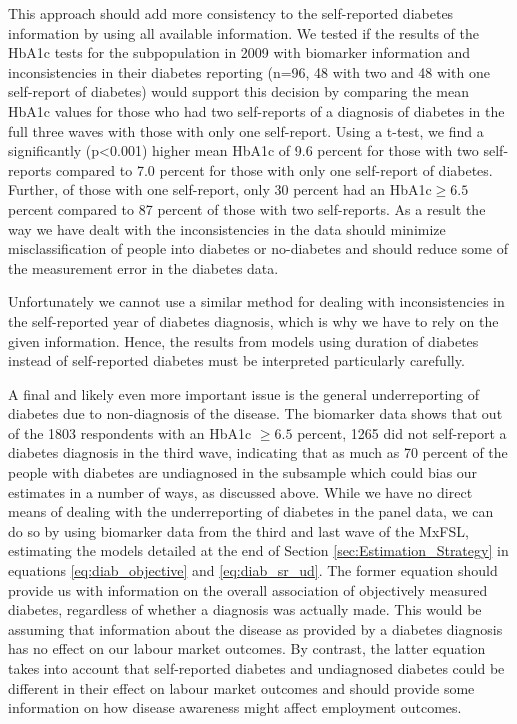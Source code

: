 This approach should add more consistency to the self-reported diabetes
information by using all available information. We tested if the results
of the \ac{HbA1c} tests for the subpopulation in 2009 with biomarker
information and inconsistencies in their diabetes reporting (n=96,
48 with two and 48 with one self-report of diabetes) would support
this decision by comparing the mean \ac{HbA1c} values for those
who had two self-reports of a diagnosis of diabetes in the full three
waves with those with only one self-report. Using a t-test, we find
a significantly (p<0.001) higher mean \ac{HbA1c} of 9.6 percent
for those with two self-reports compared to 7.0 percent for those
with only one self-report of diabetes. Further, of those with one
self-report, only 30 percent had an \ac{HbA1c}$\geq6.5$ percent
compared to 87 percent of those with two self-reports. As a result
the way we have dealt with the inconsistencies in the data should
minimize misclassification of people into diabetes or no-diabetes
and should reduce some of the measurement error in the diabetes data.

Unfortunately we cannot use a similar method for dealing with inconsistencies
in the self-reported year of diabetes diagnosis, which is why we have
to rely on the given information. Hence, the results from models using
duration of diabetes instead of self-reported diabetes must be interpreted
particularly carefully.

A final and likely even more important issue is the general underreporting
of diabetes due to non-diagnosis of the disease. The biomarker data
shows that out of the 1803 respondents with an \ac{HbA1c} $\geq6.5$
percent, 1265 did not self-report a diabetes diagnosis in the third
wave, indicating that as much as 70 percent of the people with diabetes
are undiagnosed in the subsample which could bias our estimates in
a number of ways, as discussed above. While we have no direct means
of dealing with the underreporting of diabetes in the panel data,
we can do so by using biomarker data from the third and last wave
of the \ac{MxFSL}, estimating the models detailed at the end of
Section \ref{sec:Estimation_Strategy} in equations \ref{eq:diab_objective}
and \ref{eq:diab_sr_ud}. The former equation should provide us with
information on the overall association of objectively measured diabetes,
regardless of whether a diagnosis was actually made. This would be
assuming that information about the disease as provided by a diabetes
diagnosis has no effect on our labour market outcomes. By contrast,
the latter equation takes into account that self-reported diabetes
and undiagnosed diabetes could be different in their effect on labour
market outcomes and should provide some information on how disease
awareness might affect employment outcomes.

